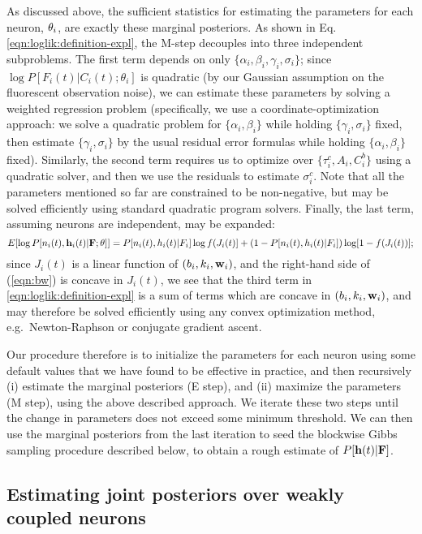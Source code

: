 As discussed above, the sufficient statistics for estimating the
parameters for each neuron, $\mathbf{\theta}_i$, are exactly these marginal
posteriors.  As shown in Eq. \eqref{eqn:loglik:definition-expl}, the
M-step decouples into three independent subproblems.  The first term
depends on only $\{\alpha_i, \beta_i, \gamma_i, \sigma_i\}$; since
$\log P[F_i(t)|C_i(t); \theta_i]$ is quadratic (by our Gaussian
assumption on the fluorescent observation noise), we can estimate
these parameters by solving a weighted regression problem
(specifically, we use a coordinate-optimization approach: we solve a
quadratic problem for $\{\alpha_i, \beta_i\}$ while holding
$\{\gamma_i, \sigma_i\}$ fixed, then estimate $\{\gamma_i,\sigma_i\}$
by the usual residual error formulas while holding $\{\alpha_i,
\beta_i\}$ fixed).  Similarly, the second term requires us to optimize
over $\{\tau_i^c, A_i, C_i^b\}$ using a quadratic solver, and then we
use the residuals to estimate $\sigma_i^c$.  Note that all the
parameters mentioned so far are constrained to be non-negative, but
may be solved efficiently using standard quadratic program solvers.
Finally, the last term, assuming neurons are independent, may be
expanded:
\begin{equation} 
  E [\log P[n_i(t), \bh_i(t) | \bF; \bth]] = P[n_i(t), h_i(t) | F_i]
\log f (J_i(t)] + (1-P[n_i(t), h_i(t) | F_i]) \log [1- f(J_i(t))];
\label{eqn:bw}
\end{equation}
since $J_i(t)$ is a linear function of $(b_i,k_i,\mathbf{w}_i)$, and the
right-hand side of (\ref{eqn:bw}) is concave in $J_i(t)$, we see that
the third term in \eqref{eqn:loglik:definition-expl} is a sum of terms
which are concave in $(b_i,k_i,\mathbf{w}_i)$, and may therefore be solved
efficiently using any convex optimization method, e.g.\ Newton-Raphson
or conjugate gradient ascent.

Our procedure therefore is to initialize the parameters for each
neuron using some default values that we have found to be effective in
practice, and then recursively (i) estimate the marginal posteriors (E
step), and (ii) maximize the parameters (M step), using the above
described approach.  We iterate these two steps until the change in
parameters does not exceed some minimum threshold.  We can then use
the marginal posteriors from the last iteration to seed the blockwise
Gibbs sampling procedure described below, to obtain a rough estimate
of $P[\mathbf{h}(t) | {\bf F}]$.

\subsection{Estimating joint posteriors over weakly coupled neurons}
\label{sec:methods:joint}

